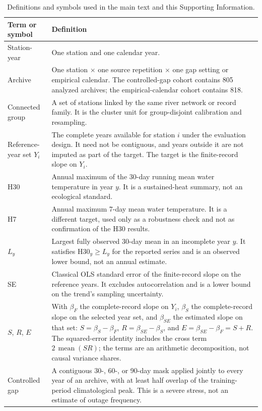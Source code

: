 \begin{table}[p]
\centering
\footnotesize
\renewcommand{\arraystretch}{0.95}
\caption{Definitions and symbols used in the main text and this Supporting Information.}
\label{tab:S9}
\begin{tabular}{>{\raggedright\arraybackslash}p{}>{\raggedright\arraybackslash}p{}}
\toprule
Term or symbol & Definition \\
\midrule
Station-year & One station and one calendar year. \\
Archive & One station $\times$ one source repetition $\times$ one gap setting or empirical calendar. The controlled-gap cohort contains 805 analyzed archives; the empirical-calendar cohort contains 818. \\
Connected group & A set of stations linked by the same river network or record family. It is the cluster unit for group-disjoint calibration and resampling. \\
Reference-year set $Y_i$ & The complete years available for station $i$ under the evaluation design. It need not be contiguous, and years outside it are not imputed as part of the target. The target is the finite-record slope on $Y_i$. \\
H30 & Annual maximum of the 30-day running mean water temperature in year $y$. It is a sustained-heat summary, not an ecological standard. \\
H7 & Annual maximum 7-day mean water temperature. It is a different target, used only as a robustness check and not as confirmation of the H30 results. \\
$L_y$ & Largest fully observed 30-day mean in an incomplete year $y$. It satisfies $\mathrm{H30}_y\ge L_y$ for the reported series and is an observed lower bound, not an annual estimate. \\
SE & Classical OLS standard error of the finite-record slope on the reference years. It excludes autocorrelation and is a lower bound on the trend's sampling uncertainty. \\
$S$, $R$, $E$ & With $\beta_F$ the complete-record slope on $Y_i$, $\beta_S$ the complete-record slope on the selected year set, and $\beta_{SE}$ the estimated slope on that set: $S=\beta_S-\beta_F$, $R=\beta_{SE}-\beta_S$, and $E=\beta_{SE}-\beta_F=S+R$. The squared-error identity includes the cross term $2\,\operatorname{mean}(SR)$; the terms are an arithmetic decomposition, not causal variance shares. \\
Controlled gap & A contiguous 30-, 60-, or 90-day mask applied jointly to every year of an archive, with at least half overlap of the training-period climatological peak. This is a severe stress, not an estimate of outage frequency. \\

\end{tabular}
\end{table}
